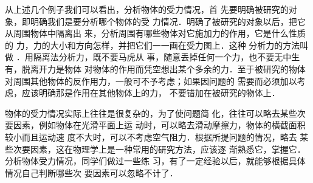     从上述几个例子我们可以看出，分析物体的受力情况，首
先要明确被研究的对象，即明确我们是要分析哪个物体的受
力情况．明确了被研究的对象以后，把它从周围物体中隔离出
来，分析周围有哪些物体对它施加力的作用，它是什么性质的
力，力的大小和方向怎样，并把它们一一画在受力图上．这种
分析力的方法叫做 ．用隔离法分析力，既不要马虎从
事，随意丢掉任何一个力，也不要无中生有，脱离开力是物体
对物体的作用而凭空想出某个多余的力．至于被研究的物体
对周围其他物体的反作用力，一般可不予考虑；如果因问题的
需要而必须加以考虑，应该明确那是作用在其他物体上的力，
不要错加在被研究的物体上．

    物体的受力情况实际上往往是很复杂的，为了使问题简
化，往往可以略去某些次要因素，例如物体在光滑平面上运
动时，可以略去滑动摩擦力，物体的横截面积较小而且运动速
度不大时，可以不考虑空气阻力．根据所提问题的情况，略去
某些次要因素，这在物理学上是一种常用的研究方法，应该逐
渐熟悉它，掌握它．
分析物体受力情况，同学们做过一些练
习，有了一定经验以后，就能够根据具体情况自己判断哪些次
要因素可以忽略不计了．


